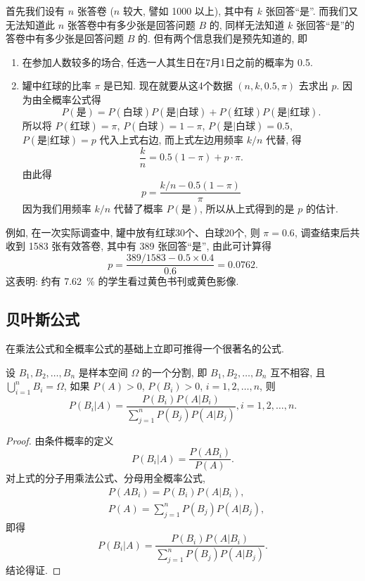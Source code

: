 首先我们设有 $n$ 张答卷 ($n$ 较大,
譬如 \num{1000} 以上),
其中有 $k$ 张回答“是”.
而我们又无法知道此 $n$ 张答卷中有多少张是回答问题 $B$ 的,
同样无法知道 $k$ 张回答“是”的答卷中有多少张是回答问题 $B$ 的.
但有两个信息我们是预先知道的,
即
\begin{enumerate}
  \item 在参加人数较多的场合,
  任选一人其生日在7月1日之前的概率为 0.5.

  \item 罐中红球的比率 $\pi$ 是已知.
  现在就要从这4个数据 $(n, k, 0.5, \pi)$ 去求出 $p$.
  因为由全概率公式得
  \[
    P(\text{是}) = P(\text{白球}) P(\text{是} | \text{白球})
    + P(\text{红球}) P(\text{是} | \text{红球}).
  \]
  所以将 $P(\text{红球}) = \pi$,
  $P(\text{白球}) = 1-\pi$,
  $P(\text{是} | \text{白球}) = 0.5$,
  $P(\text{是} | \text{红球}) = p$ 代入上式右边,
  而上式左边用频率 $k/n$ 代替,
  得
  \[
    \frac{k}{n} = 0.5 (1 - \pi) + p \cdot \pi.
  \]
  由此得
  \[
    p = \frac{k/n - 0.5(1 - \pi)}{\pi}
  \]
  因为我们用频率 $k/n$ 代替了概率 $P (\text{是})$,
  所以从上式得到的是 $p$ 的估计.
\end{enumerate}

例如,
在一次实际调查中,
罐中放有红球30个、白球20个,
则 $\pi = 0.6$,
调查结束后共收到 \num{1583} 张有效答卷,
其中有 389 张回答“是”,
由此可计算得
\[
  p = \frac{389/1583 - 0.5 \times 0.4}{0.6} = 0.0762.
\]
这表明:
约有 \SI{7.62}{\percent} 的学生看过黄色书刊或黄色影像.

\subsection{贝叶斯公式}

在乘法公式和全概率公式的基础上立即可推得一个很著名的公式.

\begin{property}[贝叶斯公式]\label{prop1.4.4}
  设 $B_1, B_2, \dotsc, B_n$ 是样本空间 $\Omega$ 的一个分割,
  即 $B_1, B_2, \dotsc, B_n$ 互不相容,
  且 $\bigcup_{i=1}^n B_i = \Omega$,
  如果 $P(A) > 0$, $P(B_i) > 0$, $i = 1,2, \dotsc, n$,
  则
  \begin{equation}
    P (B_i | A) = \frac{P(B_i) P(A|B_i)}{\sum_{j=1}^n P(B_j) P(A|B_j)},
    i = 1,2,\dotsc,n.
    \label{eq1.4.6}
  \end{equation}
\end{property}

\begin{proof}
  由条件概率的定义
  \[
    P(B_i|A) = \frac{P(AB_i)}{P(A)}.
  \]
  对上式的分子用乘法公式、分母用全概率公式,
  \begin{align*}
    & P(AB_i) = P(B_i) P(A|B_i),\\
    & P(A) = \sum_{j=1}^n P(B_j) P(A|B_j),
  \end{align*}
  即得
  \[
    P(B_i|A) = \frac{P(B_i) P(A|B_i)}{\sum_{j=1}^n P(B_j) P(A|B_j)}.
  \]
  结论得证.
\end{proof}

